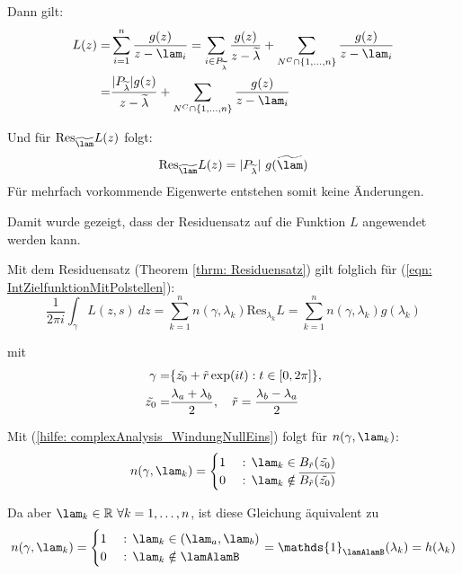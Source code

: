 \documentclass[a4paper,12pt]{report}
\newcommand{\R}{\mathbb R}
\newcommand{\1}{\mathds{1}}
\newcommand{\Res}{\text{Res}}
\theoremstyle{plain} %
\theoremstyle{definition} %
\theoremstyle{remark}
\begin{document}
\begin{itemize}
                        Dann gilt:
                        \begin{align*}
                              L(z) =& \sum_{i=1}^{n} \frac{g(z)}{z-\lam_i} = \sum_{i\in P_{\widetilde \lambda}} \frac{g(z)}{z-\widetilde{\lambda}}+\sum_{N^C\cap\{1,\dots,n\}}\frac{g(z)}{z-\lam_i}\\
                              =& \frac{|P_{\widetilde \lambda}| g(z)}{z-\widetilde{\lambda}}+\sum_{N^C\cap\{1,\dots,n\}}\frac{g(z)}{z-\lam_i}
                        \end{align*}

                        Und für $\Res_{\widetilde{\lam}}L(z)$ folgt:
                        $$\Res_{\widetilde{\lam}}L(z) = |P_{\widetilde \lambda}|\ g(\widetilde{\lam})$$
                        Für mehrfach vorkommende Eigenwerte entstehen somit keine Änderungen. 
            \end{itemize}

            Damit wurde gezeigt, dass der Residuensatz auf die Funktion $L$ angewendet werden kann.

            Mit dem Residuensatz (Theorem \ref{thrm: Residuensatz}) gilt folglich für (\ref{eqn: IntZielfunktionMitPolstellen}):
            $$\frac 1 {2\pi i}\int_\gamma L(z,s)\ dz = \sum_{k=1}^{n} n(\gamma, \lambda_k) \Res_{\lambda_k}L = \sum_{k=1}^{n} n(\gamma, \lambda_k) g(\lambda_k)$$

            mit \begin{align}
                  \gamma =& \{\Tilde{z_0} + \Tilde r\exp(i t): t\in [0,2\pi]\},\label{def: gamma}\\
                  \Tilde{z_0} =& \frac {\lambda_a+\lambda_b} {2},\quad\Tilde r = \frac {\lambda_b-\lambda_a} {2}\nonumber
            \end{align}

            Mit (\ref{hilfe: complexAnalysis_WindungNullEins}) folgt für $n(\gamma, \lam_k)$:
            $$n(\gamma, \lam_k) = \begin{cases}
                  1& \text{ : }\lam_k\in B_{\Tilde{r}}(\Tilde{z_0})\\
                  0& \text{ : }\lam_k\notin\overline {B_{\Tilde{r}}(\Tilde{z_0})}
            \end{cases}$$
            
            Da aber $\lam_k\in \R\ \forall k=1,\dots,n$, ist diese Gleichung äquivalent zu
            $$n(\gamma, \lam_k) = \begin{cases}
                  1& \text{ : }\lam_k\in (\lam_a,\lam_b)\\
                  0& \text{ : }\lam_k\notin \lamAlamB
            \end{cases} = \1_{\lamAlamB}(\lambda_k) = h(\lambda_k)$$
\end{document}
